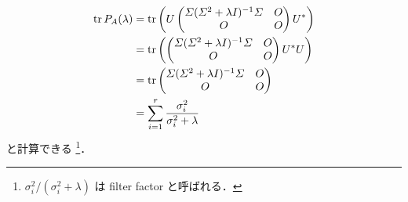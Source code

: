 \begin{align}
    \operatorname{tr}{P_A(\lambda)}
     & = \operatorname{tr}\left(U
    \begin{pmatrix}
            \varSigma (\varSigma^2 + \lambda I)^{-1} \varSigma & O \\
            O                                         & O
        \end{pmatrix}
    U^*\right)
    \notag                                                      \\
     & = \operatorname{tr}\left(
    \begin{pmatrix}
            \varSigma (\varSigma^2 + \lambda I)^{-1} \varSigma & O \\
            O                                         & O
        \end{pmatrix}
    U^* U\right)
    \notag                                                      \\
     & = \operatorname{tr}
    \begin{pmatrix}
        \varSigma (\varSigma^2 + \lambda I)^{-1} \varSigma & O \\
        O                                         & O
    \end{pmatrix}
    \notag                                                      \\
     & = \sum_{i = 1}^r \frac{\sigma_i^2}{\sigma_i^2 + \lambda}
\end{align}
と計算できる
\cite{Hansen1998}
\footnote{$\sigma_i^2 / (\sigma_i^2 + \lambda)$ は filter factor と呼ばれる．}．
